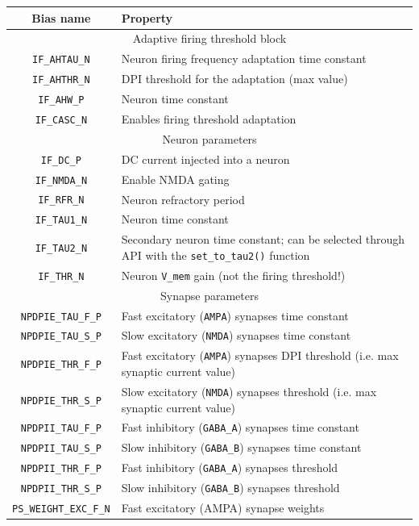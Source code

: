 \begin{table}[h!]
\begin{tabularx}{\textwidth}{|c|X|}
\hline
\textbf{Bias name}   & \textbf{Property} \\
\hline
\multicolumn{2}{c}{Adaptive firing threshold block} \\
\hline
\verb|IF_AHTAU_N| & Neuron firing frequency adaptation time constant\\ 
\verb|IF_AHTHR_N| & DPI threshold for the adaptation (max value)\\ 
\verb|IF_AHW_P| & Neuron time constant \\ 
\verb|IF_CASC_N| & Enables firing threshold adaptation \\ 
\hline
\multicolumn{2}{c}{Neuron parameters} \\
\hline
\verb|IF_DC_P| & DC current injected into a neuron \\ 
\verb|IF_NMDA_N| & Enable NMDA gating \\ 
\verb|IF_RFR_N| & Neuron refractory period \\ 
\verb|IF_TAU1_N| & Neuron time constant \\ 
\verb|IF_TAU2_N| & Secondary neuron time constant; can be selected through API with the \verb|set_to_tau2()| function\\ 
\verb|IF_THR_N| & Neuron \verb|V_mem| gain (not the firing threshold!) \\ 
\hline
\multicolumn{2}{c}{Synapse parameters} \\
\hline
\verb|NPDPIE_TAU_F_P| & Fast excitatory (\verb|AMPA|) synapses time constant\\ 
\verb|NPDPIE_TAU_S_P| & Slow excitatory (\verb|NMDA|) synapses time constant\\ 
\verb|NPDPIE_THR_F_P| & Fast excitatory (\verb|AMPA|) synapses DPI threshold (i.e. max synaptic current value)\\ 
\verb|NPDPIE_THR_S_P| & Slow excitatory (\verb|NMDA|) synapses threshold (i.e. max synaptic current value)\\ 
\verb|NPDPII_TAU_F_P| & Fast inhibitory (\verb|GABA_A|) synapses time constant\\ 
\verb|NPDPII_TAU_S_P| & Slow inhibitory (\verb|GABA_B|) synapses time constant\\ 
\verb|NPDPII_THR_F_P| & Fast inhibitory (\verb|GABA_A|) synapses threshold\\ 
\verb|NPDPII_THR_S_P| & Slow inhibitory (\verb|GABA_B|) synapses threshold\\ 
\verb|PS_WEIGHT_EXC_F_N| & Fast excitatory (AMPA) synapse weights\\ 

\end{tabularx}
\end{table}
